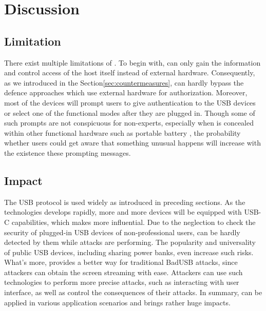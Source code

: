 \section{Discussion}
\label{sec:discussion}

\subsection{Limitation}
There exist multiple limitations of \tool.
To begin with, \tool can only gain the information and control access of the host itself instead of external hardware.
Consequently, as we introduced in the Section\ref{sec:countermeasures}, \tool can hardly bypass the defence approaches which use external hardware for authorization.
Moreover, most of the devices will prompt users to give authentication to the USB devices or select one of the functional modes after they are plugged in.
Though some of such prompts are not conspicuous for non-experts, especially when \tool is concealed within other functional hardware such as portable battery , the probability whether users could get aware that something unusual happens will increase with the existence these prompting messages.

\subsection{Impact}
The USB protocol is used widely as introduced in preceding sections.
As the technologies develops rapidly, more and more devices will be equipped with USB-C capabilities, which makes \tool more influential.
Due to the neglection to check the security of plugged-in USB devices of non-professional users, \tool can be hardly detected by them while attacks are performing.
The popularity and universality of public USB devices, including sharing power banks, even increase such risks.
What's more, \tool provides a better way for traditional BadUSB attacks, since attackers can obtain the screen streaming with ease.
Attackers can use such technologies to perform more precise attacks, such as interacting with user interface, as well as control the consequences of their attacks.
In summary, \tool can be applied in various application scenarios and brings rather huge impacts.
